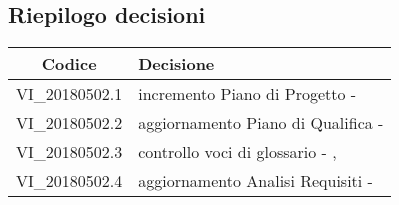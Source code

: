 \newpage
\subsection{Riepilogo decisioni}

\begin{center}
    \begin{tabular}{c | p{11cm}}
        \centering
        \rowcolor[gray]{.9} { \textbf{Codice} } & { \textbf{Decisione} } \\ 
        \hline
        \rowcolor[gray]{.8} VI\_20180502.1 & incremento Piano di Progetto - \Isacco{} \\
        \rowcolor[gray]{.9} VI\_20180502.2 & aggiornamento Piano di Qualifica - \Luca{} \\
        \rowcolor[gray]{.8} VI\_20180502.3 & controllo voci di glossario - \Tommaso{}, \Cristian{} \\
        \rowcolor[gray]{.9} VI\_20180502.4 & aggiornamento Analisi Requisiti - \Leonardo{} \\
    \end{tabular}
\end{center}
